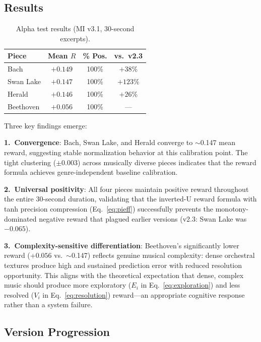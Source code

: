 \documentclass[10pt,twocolumn]{article}
\begin{document}
\subsection{Results}

\begin{table}[!t]
\centering
\caption{Alpha test results (MI v3.1, 30-second excerpts).}
\label{tab:results}
\small
\begin{tabular}{@{}lccc@{}}
\toprule
\textbf{Piece} & \textbf{Mean $R$} & \textbf{\% Pos.} & \textbf{vs.\ v2.3} \\
\midrule
Bach         & $+0.149$ & 100\% & $+38\%$ \\
Swan Lake    & $+0.147$ & 100\% & $+123\%$ \\
Herald       & $+0.146$ & 100\% & $+26\%$ \\
Beethoven    & $+0.056$ & 100\% & --- \\
\bottomrule
\end{tabular}
\end{table}

Three key findings emerge:

\textbf{1.\ Convergence}: Bach, Swan Lake, and Herald converge to $\sim$0.147 mean reward, suggesting stable normalization behavior at this calibration point.
The tight clustering ($\pm$0.003) across musically diverse pieces indicates that the reward formula achieves genre-independent baseline calibration.

\textbf{2.\ Universal positivity}: All four pieces maintain positive reward throughout the entire 30-second duration, validating that the inverted-U reward formula with tanh precision compression (Eq.~\ref{eq:pieff}) successfully prevents the monotony-dominated negative reward that plagued earlier versions (v2.3: Swan Lake was $-0.065$).

\textbf{3.\ Complexity-sensitive differentiation}: Beethoven's significantly lower reward ($+0.056$ vs.\ $\sim$0.147) reflects genuine musical complexity: dense orchestral textures produce high and sustained prediction error with reduced resolution opportunity.
This aligns with the theoretical expectation that dense, complex music should produce more exploratory ($E_i$ in Eq.~\ref{eq:exploration}) and less resolved ($V_i$ in Eq.~\ref{eq:resolution}) reward---an appropriate cognitive response rather than a system failure.

\subsection{Version Progression}
\end{document}
